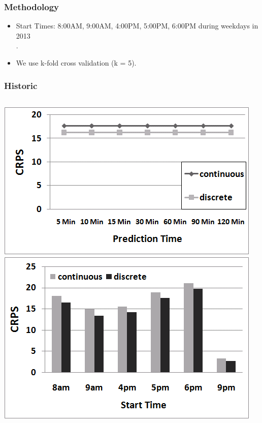 \documentclass[t]{beamer}
\begin{document}
\begin{frame}\frametitle{Methodology}
\begin{itemize}
\item Start Times: 8:00AM, 9:00AM, 4:00PM, 5:00PM, 6:00PM during weekdays in 2013\\
.
\item<3-> We use k-fold cross validation (k = 5).
\end{itemize}

\end{frame}

\begin{frame}\frametitle{Historic}
\vspace{0.5in}
\begin{columns}
		\includegraphics[scale=0.3]{Links_Historic.png}
		\includegraphics[scale=0.3]{Links_Historic_TOD.png}
\end{columns}
\end{frame}
\end{document}
